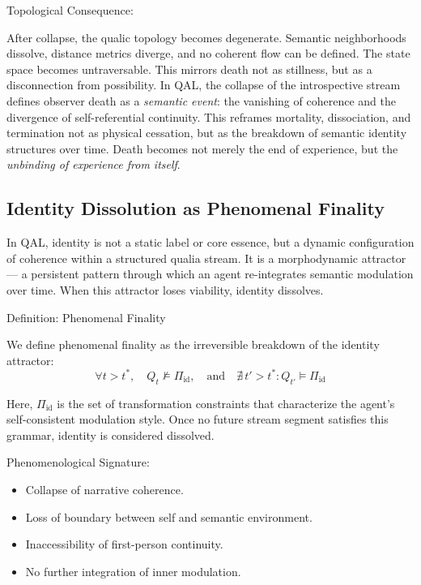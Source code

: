 \documentclass[11pt]{article}
\numberwithin{equation}{section} %
\begin{document}
\bigskip

\noindent Topological Consequence:

After collapse, the qualic topology becomes degenerate. Semantic neighborhoods dissolve, distance metrics diverge, and no coherent flow can be defined. The state space becomes untraversable. This mirrors death not as stillness, but as a disconnection from possibility. In QAL, the collapse of the introspective stream defines observer death as a \textit{semantic event}: the vanishing of coherence and the divergence of self-referential continuity. This reframes mortality, dissociation, and termination not as physical cessation, but as the breakdown of semantic identity structures over time. Death becomes not merely the end of experience, but the \textit{unbinding of experience from itself}.

\subsection{Identity Dissolution as Phenomenal Finality}

In QAL, identity is not a static label or core essence, but a dynamic configuration of coherence within a structured qualia stream. It is a morphodynamic attractor — a persistent pattern through which an agent re-integrates semantic modulation over time. When this attractor loses viability, identity dissolves.

\bigskip

\noindent Definition: Phenomenal Finality

We define phenomenal finality as the irreversible breakdown of the identity attractor:
$$
\forall t > t^*, \quad Q_t \not\models \Pi_{\text{id}}, \quad \text{and} \quad \nexists \, t' > t^* : Q_{t'} \models \Pi_{\text{id}}
$$

Here, $\Pi_{\text{id}}$ is the set of transformation constraints that characterize the agent’s self-consistent modulation style. Once no future stream segment satisfies this grammar, identity is considered dissolved.

\bigskip

\noindent Phenomenological Signature:
\begin{itemize}
\item Collapse of narrative coherence.
\item Loss of boundary between self and semantic environment.
\item Inaccessibility of first-person continuity.
\item No further integration of inner modulation.
\end{itemize}
\end{document}
